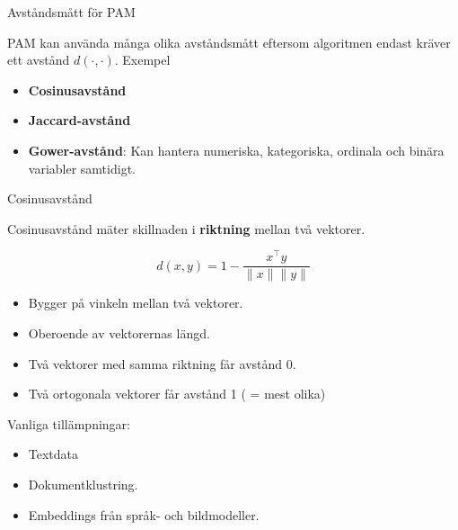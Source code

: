 \documentclass[10pt,english]{beamer}
\begin{document}
\begin{frame}{Avståndsmått för PAM}

    PAM kan använda många olika avståndsmått eftersom algoritmen
    endast kräver ett avstånd $d(\cdot,\cdot)$. Exempel

    \begin{itemize}

        \item \textbf{Cosinusavstånd}
        \item \textbf{Jaccard-avstånd}
        \item \textbf{Gower-avstånd}:
        Kan hantera numeriska, kategoriska,
        ordinala och binära variabler samtidigt.
    \end{itemize}

\end{frame}

\begin{frame}{Cosinusavstånd}

    Cosinusavstånd mäter skillnaden i \textbf{riktning}
    mellan två vektorer.

    \[
        d(x,y)
        =
        1-
        \frac{x^\top y}
             {\|x\|\|y\|}
    \]

    \begin{itemize}
        \item Bygger på vinkeln mellan två vektorer.
        \item Oberoende av vektorernas längd.
        \item Två vektorer med samma riktning får avstånd 0.
        \item Två ortogonala vektorer får avstånd 1 ( = mest olika)
    \end{itemize}

    \vspace{0.2cm}

    Vanliga tillämpningar:

    \begin{itemize}
        \item Textdata
        \item Dokumentklustring.
        \item Embeddings från språk- och bildmodeller.
    \end{itemize}

\end{frame}
\end{document}
